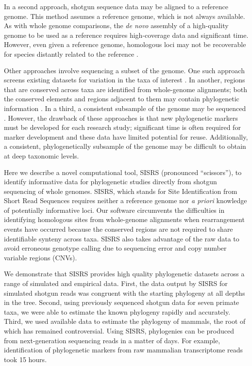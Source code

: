 \documentclass[11pt, oneside]{article}   	%
\begin{document}
In a second approach, shotgun sequence data may be aligned to a reference genome.
This method assumes a reference genome, which is not always available.
As with whole genome comparisons, the \textit{de novo} assembly of a high-quality genome to be used as a reference requires high-coverage data and significant time.
However, even given a reference genome, homologous loci may not be recoverable for species distantly related to the reference \citep{Bertels2014}.

Other approaches involve sequencing a subset of the genome.
One such approach screens existing datasets for variation in the taxa of interest \citep[e.g.][]{ONeill2013, Senn2013, Steele2008}.
In another, regions that are conserved across taxa are identified from whole-genome alignments; both the conserved elements and regions adjacent to them may contain phylogenetic information \citep[e.g.][] {Crawford2012,Faircloth2012,McCormack2012,Lemmon2012}. 
In a third, a consistent subsample of the genome may be sequenced \citep[e.g.\ using RADseq;][]{Eaton2013}.
However, the drawback of these approaches is that new phylogenetic markers must be developed for each research study; significant time is often required for marker development and these data have limited potential for reuse. 
Additionally, a consistent, phylogenetically subsample of the genome may be difficult to obtain at deep taxonomic levels.

Here we describe a novel computational tool, SISRS (pronounced ``scissors''), to identify informative data for phylogenetic studies directly from shotgun sequencing of whole genomes. 
SISRS, which stands for Site Identification from Short Read Sequences requires neither a reference genome nor \textit{a priori} knowledge of potentially informative loci. 
Our software circumvents the difficulties in identifying homologous sites from whole-genome alignments when rearrangement events have occurred because the conserved regions are not required to share identifiable synteny across taxa. 
SISRS also takes advantage of the raw data to avoid erroneous genotype calling due to sequencing error and copy number variable regions (CNVs). 

We demonstrate that SISRS provides high quality phylogenetic datasets across a range of simulated and empirical data. 
First, the data output by SISRS for simulated shotgun reads was congruent with the starting phylogeny at all depths in the tree. 
Second, using previously sequenced shotgun data for seven primate taxa, we were able to estimate the known phylogeny rapidly and accurately. 
Third, we used available data to estimate the phylogeny of mammals, the root of which has remained controversial.
Using SISRS, phylogenies can be produced from next-generation sequencing reads in a matter of days.
For example, identification of phylogenetic markers from raw mammalian transcriptome reads took 15 hours.
\end{document}
